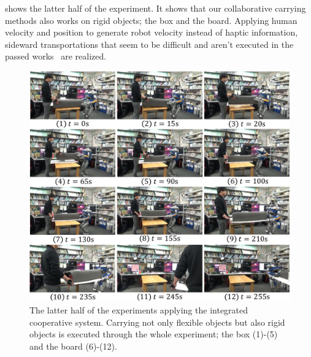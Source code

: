  shows the latter half of the experiment. It shows that our collaborative carrying methods also works on rigid objects; the box and the board. Applying human velocity and position to generate robot velocity instead of haptic information, sideward transportations that seem to be difficult and aren't executed in the passed works~\cite{aist_cooperative_carrying}\cite{carry_with_vision} are realized.

\begin{figure}[htbp]
  \begin{center}
    \includegraphics[width=1.00\columnwidth]{figs/demo_all_02}
    \caption{The latter half of the experiments applying the integrated cooperative system. Carrying not only flexible objects but also rigid objects is executed through the whole experiment; the box (1)-(5) and the board (6)-(12).}
    \label{figure:demo_all_2}
  \end{center}
\end{figure}

